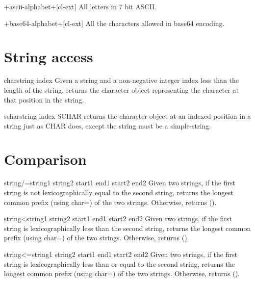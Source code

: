 \documentclass[10pt,english]{book}
\begin{document}
\begin{constant}{+ascii-alphabet+}{}[cl-ext]
  All letters in 7 bit ASCII.
\end{constant}

\begin{constant}{+base64-alphabet+}{}[cl-ext]
  All the characters allowed in base64 encoding.
\end{constant}

\section{String access}
\label{sec:string-access}

\begin{accessor}{char}{string index}
  Given a string and a non-negative integer index less than the length of
  the string, returns the character object representing the character at
  that position in the string.
\end{accessor}

\begin{accessor}{schar}{string index}
  SCHAR returns the character object at an indexed position in a string
   just as CHAR does, except the string must be a simple-string.
\end{accessor}

\section{Comparison}
\label{sec:string-comparison}

\begin{function}{string/=}{string1 string2 \key start1 end1 start2 end2}
  Given two strings, if the first string is not lexicographically equal
  to the second string, returns the longest common prefix (using char=)
  of the two strings. Otherwise, returns ().
\end{function}

\begin{function}{string<}{string1 string2 \key start1 end1 start2 end2}
  Given two strings, if the first string is lexicographically less than
  the second string, returns the longest common prefix (using char=)
  of the two strings. Otherwise, returns ().
\end{function}

\begin{function}{string<=}{string1 string2 \key start1 end1 start2 end2}
  Given two strings, if the first string is lexicographically less than
  or equal to the second string, returns the longest common prefix
  (using char=) of the two strings. Otherwise, returns ().
\end{function}
\end{document}
